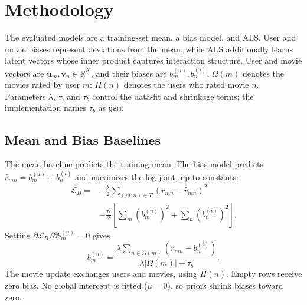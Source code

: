 \section{Methodology}
The evaluated models are a training-set mean, a bias model, and ALS. User and movie biases represent deviations from the mean, while ALS additionally learns latent vectors whose inner product captures interaction structure. User and movie vectors are $\mathbf{u}_m,\mathbf{v}_n\in\mathbb R^K$, and their biases are $b_m^{(u)},b_n^{(i)}$. $\Omega(m)$ denotes the movies rated by user $m$; $\Pi(n)$ denotes the users who rated movie $n$. Parameters $\lambda$, $\tau$, and $\tau_b$ control the data-fit and shrinkage terms; the implementation names $\tau_b$ as \texttt{gam}.

\subsection{Mean and Bias Baselines}
The mean baseline predicts the training mean. The bias model predicts $\widehat r_{mn}=b_m^{(u)}+b_n^{(i)}$ and maximizes the log joint, up to constants:
\begin{align}
\mathcal L_B={}&-\frac{\lambda}{2}\sum_{(m,n)\in T}(r_{mn}-\widehat r_{mn})^2\nonumber\\
&-\frac{\tau_b}{2}\left[\sum_m(b_m^{(u)})^2+\sum_n(b_n^{(i)})^2\right].
\label{eq:bias-objective}
\end{align}
Setting $\partial\mathcal L_B/\partial b_m^{(u)}=0$ gives
\begin{equation}
b_m^{(u)}=\frac{\lambda\sum_{n\in\Omega(m)}(r_{mn}-b_n^{(i)})}
{\lambda|\Omega(m)|+\tau_b}.
\label{eq:bias}
\end{equation}
The movie update exchanges users and movies, using $\Pi(n)$. Empty rows receive zero bias. No global intercept is fitted ($\mu=0$), so priors shrink biases toward zero.

